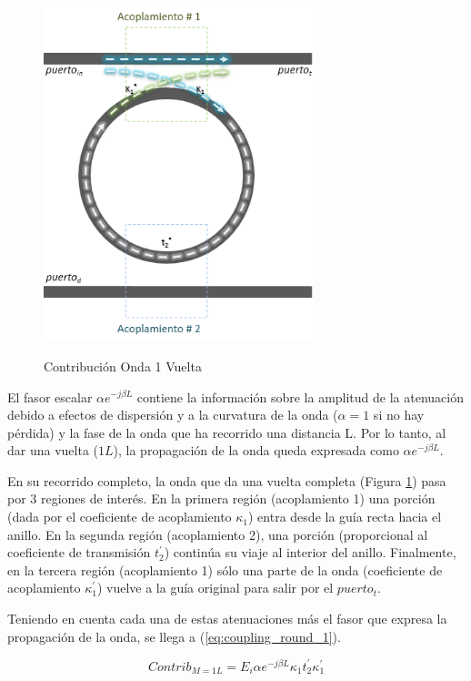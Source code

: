 \begin{figure}[h!]
\caption{Contribución Onda 1 Vuelta}
\centering
\includegraphics[width=0.7\textwidth,natwidth=397,natheight=490]{figs/rr_n1.PNG}
\label{fig:rr_n1}
\end{figure} 

El fasor escalar $\alpha e^{-j \beta L}$ contiene la información sobre la amplitud de
la atenuación debido a efectos de dispersión y a la curvatura de la onda 
($\alpha=1$ si no hay pérdida)
y la fase de la onda que ha recorrido una distancia L. 
Por lo tanto, al dar una vuelta ($1L$), la propagación de la onda queda expresada como 
$\alpha e^{-j \beta L}$.

En su recorrido completo, la onda que da una vuelta completa (Figura \ref{fig:rr_n1}) 
pasa por 3 regiones de interés. 
En la primera región (acoplamiento 1) una porción (dada por el coeficiente de acoplamiento 
$\kappa_1$) entra desde la guía recta hacia el anillo.
En la segunda región (acoplamiento 2), una porción (proporcional al coeficiente de transmisión 
$t_2^{'}$) continúa su viaje al interior del anillo.
Finalmente, en la tercera región (acoplamiento 1) sólo una parte de la onda 
(coeficiente de acoplamiento $\kappa_1^{'}$) vuelve a la guía original para 
salir por el $puerto_t$. 


Teniendo en cuenta cada una de estas atenuaciones más el fasor que expresa la propagación
de la onda, se llega a (\ref{eq:coupling_round_1}).

\begin{equation}
Contrib_{M=1L} = E_i \alpha e^{-j \beta L} \kappa_1 t_2^{'} \kappa_1^{'}
\label{eq:coupling_round_1}
\end{equation} 

